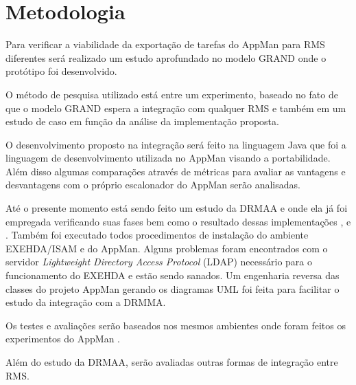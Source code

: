 \section{Metodologia}
\label{cap:metodologia}

Para verificar a viabilidade da exportação de tarefas do AppMan para RMS diferentes será realizado um estudo aprofundado no modelo GRAND onde o protótipo foi desenvolvido.

O método de pesquisa utilizado está entre um experimento, baseado no fato de que o modelo GRAND espera a integração com qualquer RMS e também em um estudo de caso em função da análise da implementação proposta.

O desenvolvimento proposto na integração será feito na linguagem Java que foi a linguagem de desenvolvimento utilizada no AppMan visando a portabilidade. Além disso algumas comparações através de métricas para avaliar as vantagens e desvantagens com o próprio escalonador do AppMan serão analisadas.

Até o presente momento está sendo feito um estudo da DRMAA e onde ela já foi empregada verificando suas fases bem como o resultado dessas implementações \cite{Templeton}, \cite{Llorente2005} e \cite{Haas2004}. Também foi executado todos procedimentos de instalação do ambiente EXEHDA/ISAM e do AppMan. Alguns problemas foram encontrados com o servidor \emph{ Lightweight Directory Access Protocol} (LDAP) necessário para o funcionamento do EXEHDA e estão sendo sanados. Um engenharia reversa das classes do projeto AppMan gerando os diagramas UML foi feita para facilitar o estudo da integração com a DRMMA.

Os testes e avaliações serão baseados nos mesmos ambientes onde foram feitos os experimentos do AppMan \cite{Mangan2006}. 

Além do estudo da DRMAA, serão avaliadas outras formas de integração entre RMS.
